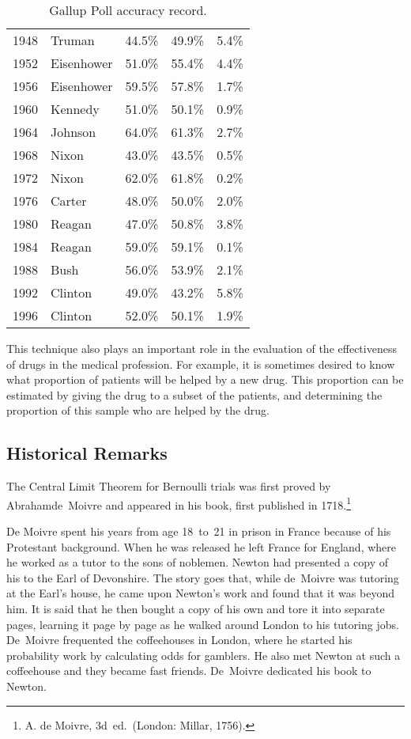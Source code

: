 \begin{example}
\begin{table}
\begin{tabular}{clccc}
1948 & Truman     & 44.5\% & 49.9\% & 5.4\%\\
1952 & Eisenhower & 51.0\% & 55.4\% & 4.4\%\\
1956 & Eisenhower & 59.5\% & 57.8\% & 1.7\%\\
1960 & Kennedy    & 51.0\% & 50.1\% & 0.9\%\\
1964 & Johnson    & 64.0\% & 61.3\% & 2.7\%\\
1968 & Nixon      & 43.0\% & 43.5\% & 0.5\%\\
1972 & Nixon      & 62.0\% & 61.8\% & 0.2\%\\
1976 & Carter     & 48.0\% & 50.0\% & 2.0\%\\
1980 & Reagan     & 47.0\% & 50.8\% & 3.8\%\\
1984 & Reagan     & 59.0\% & 59.1\% & 0.1\%\\
1988 & Bush       & 56.0\% & 53.9\% & 2.1\%\\
1992 & Clinton    & 49.0\% & 43.2\% & 5.8\%\\
1996 & Clinton    & 52.0\% & 50.1\% & 1.9\%\\
\end{tabular}
\caption{Gallup Poll accuracy record.}
\label{table 9.1}
\end{table}
\par
This technique also plays an important role in the evaluation of the effectiveness of drugs in the
medical profession.  For example, it is sometimes desired to know what proportion of patients
will be helped by a new drug.  This proportion can be estimated by giving the drug to a subset of
the patients, and determining the proportion of this sample who are helped by the drug.
\end{example}



\subsection*{Historical Remarks}
The Central Limit Theorem for Bernoulli trials was first proved by Abraham\linebreak[4]
de~Moivre and appeared in his book,  first
published in 1718.\footnote{A. de Moivre,  3d~ed.\ (London: Millar,
1756).}

De Moivre spent his years from age 18~to~21 in prison in France because of his
Protestant background.  When he was released he left France for England, where
he worked as a tutor to the sons of noblemen.  Newton had presented a copy of
his  to the Earl of Devonshire.  The story goes
that, while de~Moivre was tutoring at the Earl's house, he came upon Newton's
work and found that it was beyond him.  It is said that he then bought a copy of
his own and tore it into separate pages, learning it page by page as he walked
around London to his tutoring jobs.  De~Moivre frequented the coffeehouses in
London, where he started his probability work by calculating odds for
gamblers.  He also met Newton at such a coffeehouse and they became fast
friends.  De~Moivre dedicated his book to Newton.

